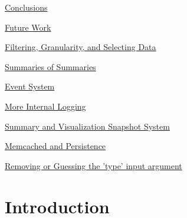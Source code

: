 \documentclass[10pt,a4paper,english]{article}
\begin{document}
\begin{list}{}{}
\begin{list}{}{}
\end{list}

\item {} \href{\#conclusions}{Conclusions}

\item {} \href{\#future-work}{Future Work}
\begin{list}{}{}
\item {} \href{\#filtering-granularity-and-selecting-data}{Filtering, Granularity, and Selecting Data}

\item {} \href{\#summaries-of-summaries}{Summaries of Summaries}

\item {} \href{\#event-system}{Event System}

\item {} \href{\#more-internal-logging}{More Internal Logging}

\item {} \href{\#summary-and-visualization-snapshot-system}{Summary and Visualization Snapshot System}

\item {} \href{\#memcached-and-persistence}{Memcached and Persistence}

\item {} \href{\#removing-or-guessing-the-type-input-argument}{Removing or Guessing the 'type' input argument}

\end{list}

\end{list}



\pagebreak{}




\hypertarget{introduction}{}
\section*{Introduction}
\label{introduction}
\end{document}
